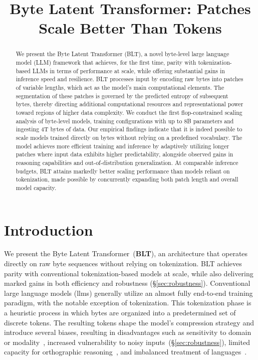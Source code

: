 \title{Byte Latent Transformer: Patches Scale Better Than Tokens}

\begin{abstract}
We present the Byte Latent Transformer ({\textsc BLT}), a novel byte-level large language model (LLM) framework that achieves, for the first time, parity with tokenization-based LLMs in terms of performance at scale, while offering substantial gains in inference speed and resilience. {\textsc BLT} processes input by encoding raw bytes into patches of variable lengths, which act as the model’s main computational elements. The segmentation of these patches is governed by the predicted entropy of subsequent bytes, thereby directing additional computational resources and representational power toward regions of higher data complexity. We conduct the first flop-constrained scaling analysis of byte-level models, training configurations with up to 8B parameters and ingesting 4T bytes of data. Our empirical findings indicate that it is indeed possible to scale models trained directly on bytes without relying on a predefined vocabulary. The model achieves more efficient training and inference by adaptively utilizing longer patches where input data exhibits higher predictability, alongside observed gains in reasoning capabilities and out-of-distribution generalization. At comparable inference budgets, {\textsc BLT} attains markedly better scaling performance than models reliant on tokenization, made possible by concurrently expanding both patch length and overall model capacity.
\end{abstract}

\section{Introduction}
\label{section:intro}

We present the Byte Latent Transformer~(\textbf{BLT}), an architecture that operates directly on raw byte sequences without relying on tokenization. BLT achieves parity with conventional tokenization-based models at scale, while also delivering marked gains in both efficiency and robustness (\S\ref{sec:robustness}).
Conventional large language models (llms) generally utilize an almost fully end-to-end training paradigm, with the notable exception of tokenization. This tokenization phase is a heuristic process in which bytes are organized into a predetermined set of discrete tokens. The resulting tokens shape the model’s compression strategy and introduce several biases, resulting in disadvantages such as sensitivity to domain or modality~\citep{dagangetting}, increased vulnerability to noisy inputs~(\S\ref{sec:robustness}), limited capacity for orthographic reasoning~\citep{edman2024cute}, and imbalanced treatment of languages~\citep{liang2023xlm,petrov2024language,limisiewicz2024myte}.

